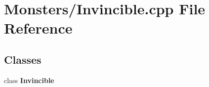 \section{Monsters/\-Invincible.cpp File Reference}
\label{_invincible_8cpp}
\subsection*{Classes}
\begin{DoxyCompactItemize}
\item 
class {\bf Invincible}
\end{DoxyCompactItemize}
